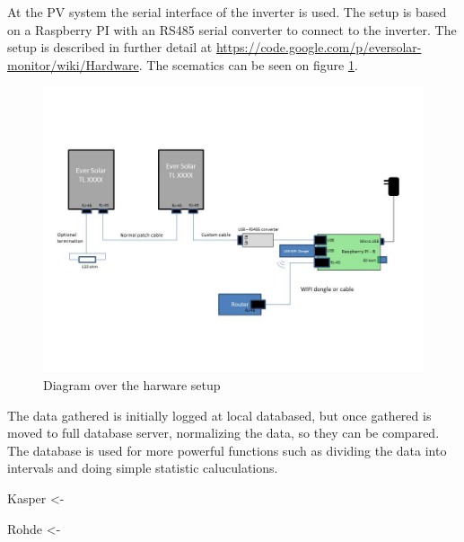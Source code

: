 At the PV system the serial interface of the inverter is used.  The
setup is based on a Raspberry PI with an RS485 serial converter to
connect to the inverter.  The setup is described in further detail at
\url{https://code.google.com/p/eversolar-monitor/wiki/Hardware}.  The
scematics can be seen on figure \ref{fig:hardware}.

\begin{figure}[h]
  \centering
  \includegraphics{hardware.jpg}
  \caption{Diagram over the harware setup}
  \label{fig:hardware}
\end{figure}

The data gathered is initially logged at local databased, but once
gathered is moved to full database server, normalizing the data, so
they can be compared.  The database is used for more powerful
functions such as dividing the data into intervals and doing simple
statistic caluculations.

Kasper <-

Rohde <-

